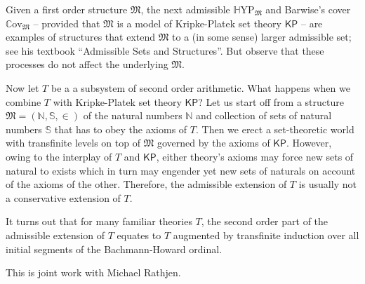 \documentclass[bsl,meeting]{asl}
\newcommand{\NP}{}
\begin{document}
\thispagestyle{empty}


\NP  
{}


\smallskip

Given a first order structure $\mathfrak{M}$, the next admissible $\mathbb{H}\mathrm{YP}_{\mathfrak{M}}$ and Barwise's cover $\mathbb{C}\mathrm{ov}_{\mathfrak{M}}$ -- provided that $\mathfrak{M}$ is a model of Kripke-Platek set theory $\mathsf{KP}$  -- are examples of structures that extend $\mathfrak{M}$ to a (in some sense) larger admissible set; see his textbook ``Admissible Sets and Structures''. But observe that these processes do not affect the underlying $\mathfrak{M}$.

\smallskip

Now let $T$ be a a subsystem of second order arithmetic. What happens when we combine $T$ with Kripke-Platek set theory $\mathsf{KP}$? Let us start off from a structure $\mathfrak{M} = (\mathbb{N},\mathbb{S},\in)$ of the natural numbers $\mathbb{N}$ and collection of sets of natural numbers $\mathbb{S}$ that has to obey the axioms of $T$. Then we erect a set-theoretic world with transfinite levels on top of $\mathfrak{M}$ governed by the axioms of $\mathsf{KP}$. However, owing to the interplay of $T$ and $\mathsf{KP}$, either theory's axioms may force new sets of natural to exists which in turn may engender yet new sets of naturals on account of the axioms of the other.  Therefore, the admissible extension of $T$ is usually not a conservative extension of $T$.

\smallskip

It turns out that for many familiar theories $T$, the second order part of the admissible extension of  $T$ equates to $T$ augmented by transfinite induction over all initial segments of the Bachmann-Howard ordinal.

\smallskip

This is joint work with Michael Rathjen.



\vspace*{-0.5\baselineskip}
\end{document}
